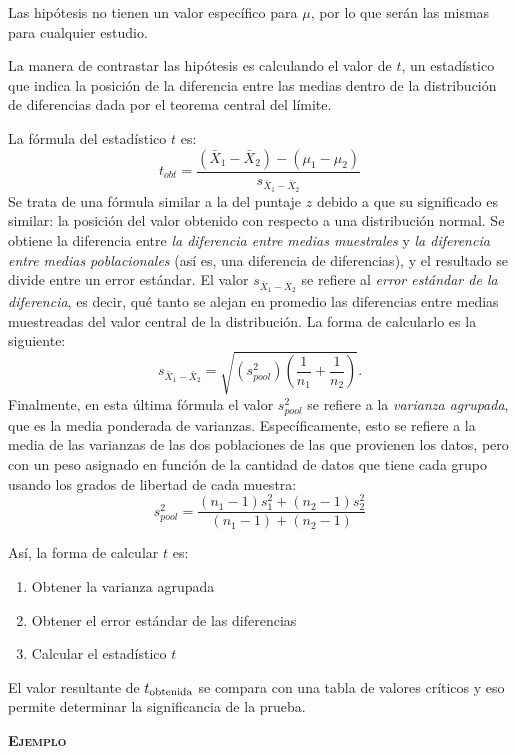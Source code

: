 \documentclass[a4paper,12pt]{article}
\begin{document}
Las hipótesis no tienen un valor específico para $\mu$, por lo que serán las mismas para cualquier estudio.

La manera de contrastar las hipótesis es calculando el valor de $t$, un estadístico que indica la posición de la diferencia entre las medias dentro de la distribución de diferencias dada por el teorema central del límite.

La fórmula del estadístico $t$ es:
\[
  t_{obt} = \frac{
    (\bar{X}_{1} - \bar{X}_{2}) - (\mu_{1} - \mu_{2})
  }{
    s_{\bar{X}_{1} - \bar{X}_{2}}
  }
\]
Se trata de una fórmula similar a la del puntaje $z$ debido a que su significado es similar: la posición del valor obtenido con respecto a una distribución normal. Se obtiene la diferencia entre {\slshape la diferencia entre medias muestrales} y {\slshape la diferencia entre medias poblacionales} (así es, una diferencia de diferencias), y el resultado se divide entre un error estándar. El valor $s_{\bar{X}_{1} - \bar{X}_{2}}$ se refiere al {\slshape error estándar de la diferencia}, es decir, qué tanto se alejan en promedio las diferencias entre medias muestreadas del valor central de la distribución. La forma de calcularlo es la siguiente:
\[
  s_{\bar{X}_{1} - \bar{X}_{2}} =\sqrt{
    \left(s_{pool}^{2}\right)\left(\frac{1}{n_{1}} + \frac{1}{n_{2}}\right)
  }
.\]
Finalmente, en esta última fórmula el valor $s_{pool}^{2}$ se refiere a la {\slshape varianza agrupada}, que es la media ponderada de varianzas. Específicamente, esto se refiere a la media de las varianzas de las dos poblaciones de las que provienen los datos, pero con un peso asignado en función de la cantidad de datos que tiene cada grupo usando los grados de libertad de cada muestra:
\[
  s_{pool}^{2} = \frac{
    (n_{1} - 1)s_{1}^{2} + (n_{2} - 1)s_{2}^{2}
  }{
    (n_{1} - 1) + (n_{2} - 1)
  }
\]

Así, la forma de calcular $t$ es:
\begin{enumerate}
  \item Obtener la varianza agrupada
  \item Obtener el error estándar de las diferencias
  \item Calcular el estadístico $t$
\end{enumerate}

El valor resultante de $t_{\mbox{\scriptsize obtenida}}$ se compara con una tabla de valores críticos y eso permite determinar la significancia de la prueba.

{\noindent\scshape\bfseries Ejemplo}
\end{document}
